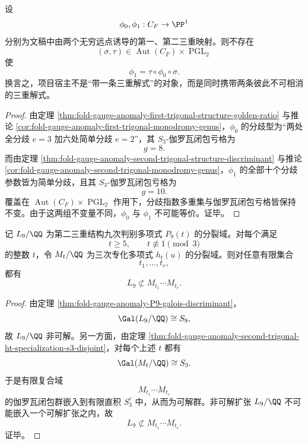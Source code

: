 \begin{theorem}[两条三重结构在覆盖范畴中绝不等价]\label{thm:conclusion-cf-two-trigonal-structures-never-equivalent}
设
\[
\phi_0,\phi_1:C_F\to \PP^1
\]
分别为文稿中由两个无穷远点诱导的第一、第二三重映射。则不存在
\[
(\sigma,\tau)\in \operatorname{Aut}(C_F)\times \operatorname{PGL}_2
\]
使
\[
\phi_1=\tau\circ \phi_0\circ \sigma .
\]
换言之，项目宿主不是“带一条三重解式”的对象，而是同时携带两条彼此不可相消的三重解式。
\end{theorem}
\begin{proof}
由定理 \ref{thm:fold-gauge-anomaly-first-trigonal-structure-golden-ratio} 与推论 \ref{cor:fold-gauge-anomaly-first-trigonal-monodromy-genus}，\(\phi_0\) 的分歧型为“两处全分歧 \(e=3\) 加六处简单分歧 \(e=2\)”，其 \(S_3\)-伽罗瓦闭包亏格为
\[
g=8.
\]
而由定理 \ref{thm:fold-gauge-anomaly-second-trigonal-structure-discriminant} 与推论 \ref{cor:fold-gauge-anomaly-second-trigonal-monodromy-genus}，\(\phi_1\) 的全部十个分歧参数皆为简单分歧，且其 \(S_3\)-伽罗瓦闭包亏格为
\[
g=10.
\]
覆盖在 \(\operatorname{Aut}(C_F)\times \operatorname{PGL}_2\) 作用下，分歧指数多重集与伽罗瓦闭包亏格皆保持不变。由于这两组不变量不同，\(\phi_0\) 与 \(\phi_1\) 不可能等价。证毕。
\end{proof}

\begin{theorem}[有限个三次纤维绝不生成第二分歧九次域]\label{thm:conclusion-second-branch-ninefold-field-not-generated-by-finitely-many-cubic-fibers}
记 \(L_9/\QQ\) 为第二三重结构九次判别多项式 \(P_9(t)\) 的分裂域。对每个满足
\[
t\ge 5,\qquad t\not\equiv 1\pmod 3
\]
的整数 \(t\)，令 \(M_t/\QQ\) 为三次专化多项式 \(h_t(u)\) 的分裂域。则对任意有限集合
\[
t_1,\dots,t_r,
\]
都有
\[
L_9\not\subset M_{t_1}\cdots M_{t_r}.
\]
\end{theorem}
\begin{proof}
由定理 \ref{thm:fold-gauge-anomaly-P9-galois-discriminant}，
\[
\Gal(L_9/\QQ)\cong S_9,
\]
故 \(L_9/\QQ\) 非可解。另一方面，由定理 \ref{thm:fold-gauge-anomaly-second-trigonal-ht-specialization-s3-disjoint}，对每个上述 \(t\) 都有
\[
\Gal(M_t/\QQ)\cong S_3.
\]
于是有限复合域
\[
M_{t_1}\cdots M_{t_r}
\]
的伽罗瓦闭包群嵌入到有限直积 \(S_3^r\) 中，从而为可解群。非可解扩张 \(L_9/\QQ\) 不可能嵌入一个可解扩张之内，故
\[
L_9\not\subset M_{t_1}\cdots M_{t_r}.
\]
证毕。
\end{proof}

